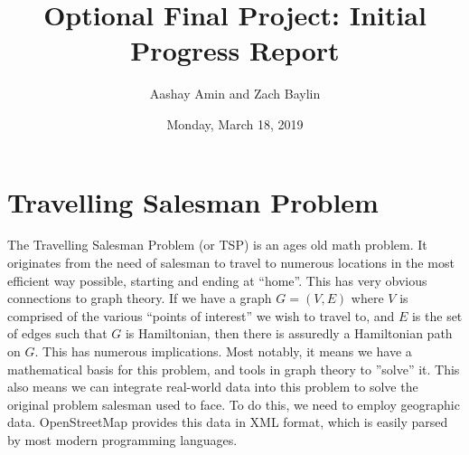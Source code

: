 \documentclass{article}
\title{Optional Final Project: Initial Progress Report}
\author{Aashay Amin and Zach Baylin}
\date{Monday, March 18, 2019}
\begin{document}
  \maketitle
  \section{Travelling Salesman Problem}
    The Travelling Salesman Problem (or TSP) is an ages old math problem. It originates from the need of salesman to travel to numerous locations in the most efficient way possible, starting and ending at ``home''. This has very obvious connections to graph theory. If we have a graph $G=(V,E)$ where $V$ is comprised of the various ``points of interest'' we wish to travel to, and $E$ is the set of edges such that $G$ is Hamiltonian, then there is assuredly a Hamiltonian path on $G$. This has numerous implications. Most notably, it means we have a mathematical basis for this problem, and tools in graph theory to ''solve'' it. This also means we can integrate real-world data into this problem to solve the original problem salesman used to face. To do this, we need to employ geographic data. OpenStreetMap provides this data in XML format, which is easily parsed by most modern programming languages.
\end{document}

